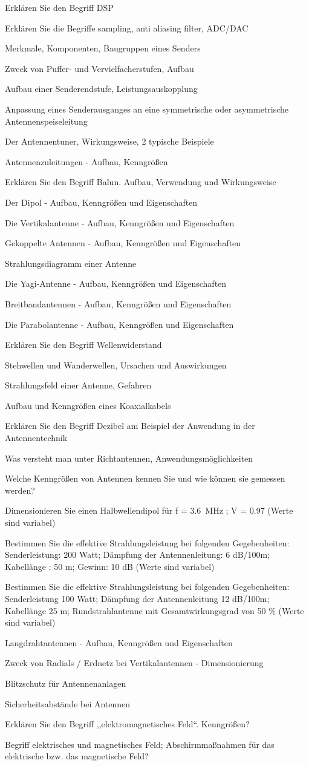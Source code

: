 \documentclass[avery5371,grid,frame,a4paper]{flashcards}
\newcommand\question[2]{
  \begin{flashcard}[{\chap} -- #1]{#2}\end{flashcard}
}
\begin{document}
\question{55}{Erklären Sie den Begriff DSP}
\question{56}{Erklären Sie die Begriffe sampling, anti aliasing filter, ADC/DAC}
\question{57}{Merkmale, Komponenten, Baugruppen eines Senders}
\question{58}{Zweck von Puffer- und Vervielfacherstufen, Aufbau}
\question{59}{Aufbau einer Senderendstufe, Leistungsauskopplung}
\question{60}{Anpassung eines Senderausganges an eine symmetrische oder asymmetrische Antennenspeiseleitung}
\question{61}{Der Antennentuner, Wirkungsweise, 2 typische Beispiele}
\question{62}{Antennenzuleitungen - Aufbau, Kenngrößen}
\question{63}{Erklären Sie den Begriff Balun. Aufbau, Verwendung und Wirkungsweise}
\question{64}{Der Dipol - Aufbau, Kenngrößen und Eigenschaften}
\question{65}{Die Vertikalantenne - Aufbau, Kenngrößen und Eigenschaften}
\question{66}{Gekoppelte Antennen - Aufbau, Kenngrößen und Eigenschaften}
\question{67}{Strahlungsdiagramm einer Antenne}
\question{68}{Die Yagi-Antenne - Aufbau, Kenngrößen und Eigenschaften}
\question{69}{Breitbandantennen - Aufbau, Kenngrößen und Eigenschaften}
\question{70}{Die Parabolantenne - Aufbau, Kenngrößen und Eigenschaften}
\question{71}{Erklären Sie den Begriff Wellenwiderstand}
\question{72}{Stehwellen und Wanderwellen, Ursachen und Auswirkungen}
\question{73}{Strahlungsfeld einer Antenne, Gefahren}
\question{74}{Aufbau und Kenngrößen eines Koaxialkabels}
\question{75}{Erklären Sie den Begriff Dezibel am Beispiel der Anwendung in der Antennentechnik}
\question{76}{Was versteht man unter Richtantennen, Anwendungsmöglichkeiten}
\question{77}{Welche Kenngrößen von Antennen kennen Sie und wie können sie gemessen werden?}
\question{78}{Dimensionieren Sie einen Halbwellendipol für f = 3.6~MHz ; V = 0.97 (Werte sind variabel)}
\question{79}{Bestimmen Sie die effektive Strahlungsleistung bei folgenden Gegebenheiten: Senderleistung: 200 Watt; Dämpfung der Antennenleitung: 6 dB/100m; Kabellänge : 50 m; Gewinn: 10 dB (Werte sind variabel)}
\question{80}{Bestimmen Sie die effektive Strahlungsleistung bei folgenden Gegebenheiten: Senderleistung 100 Watt; Dämpfung der Antennenleitung 12 dB/100m; Kabellänge 25 m; Rundstrahlantenne mit Gesamtwirkungsgrad von 50 \% (Werte sind variabel)}
\question{81}{Langdrahtantennen - Aufbau, Kenngrößen und Eigenschaften}
\question{82}{Zweck von Radials / Erdnetz bei Vertikalantennen - Dimensionierung}
\question{83}{Blitzschutz für Antennenanlagen}
\question{84}{Sicherheitsabstände bei Antennen}
\question{85}{Erklären Sie den Begriff ,,elektromagnetisches Feld``. Kenngrößen?}
\question{86}{Begriff elektrisches und magnetisches Feld; Abschirmmaßnahmen für das elektrische bzw. das magnetische Feld?}
\end{document}

